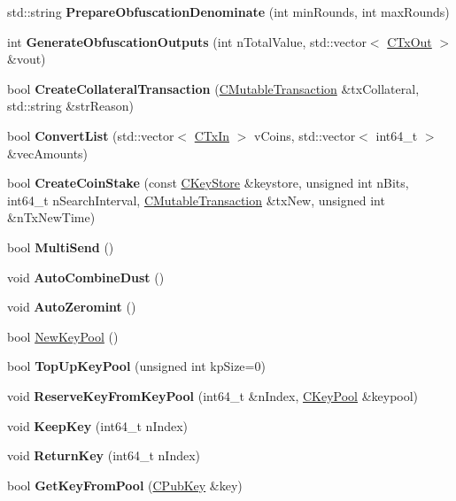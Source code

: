 \begin{DoxyCompactItemize}
\item 
std\+::string {\bfseries Prepare\+Obfuscation\+Denominate} (int min\+Rounds, int max\+Rounds)
\item 
\mbox{\label{class_c_wallet_a68e3d42562142942de698edd3f8d5ea0}} 
int {\bfseries Generate\+Obfuscation\+Outputs} (int n\+Total\+Value, std\+::vector$<$ \mbox{\hyperlink{class_c_tx_out}{C\+Tx\+Out}} $>$ \&vout)
\item 
bool {\bfseries Create\+Collateral\+Transaction} (\mbox{\hyperlink{struct_c_mutable_transaction}{C\+Mutable\+Transaction}} \&tx\+Collateral, std\+::string \&str\+Reason)
\item 
bool {\bfseries Convert\+List} (std\+::vector$<$ \mbox{\hyperlink{class_c_tx_in}{C\+Tx\+In}} $>$ v\+Coins, std\+::vector$<$ int64\+\_\+t $>$ \&vec\+Amounts)
\item 
bool {\bfseries Create\+Coin\+Stake} (const \mbox{\hyperlink{class_c_key_store}{C\+Key\+Store}} \&keystore, unsigned int n\+Bits, int64\+\_\+t n\+Search\+Interval, \mbox{\hyperlink{struct_c_mutable_transaction}{C\+Mutable\+Transaction}} \&tx\+New, unsigned int \&n\+Tx\+New\+Time)
\item 
\mbox{\label{class_c_wallet_ace77e9b4ffcfdbc61a327d02168620a2}} 
bool {\bfseries Multi\+Send} ()
\item 
\mbox{\label{class_c_wallet_a48b1e3fba569989535063b9b5308aa9e}} 
void {\bfseries Auto\+Combine\+Dust} ()
\item 
\mbox{\label{class_c_wallet_aef0cf2b12b958c75d72e694e4f4dad9f}} 
void {\bfseries Auto\+Zeromint} ()
\item 
bool \mbox{\hyperlink{group___actions_ga7353ba1e79fc4167fbfbe79b41698fa7}{New\+Key\+Pool}} ()
\item 
bool {\bfseries Top\+Up\+Key\+Pool} (unsigned int kp\+Size=0)
\item 
void {\bfseries Reserve\+Key\+From\+Key\+Pool} (int64\+\_\+t \&n\+Index, \mbox{\hyperlink{class_c_key_pool}{C\+Key\+Pool}} \&keypool)
\item 
void {\bfseries Keep\+Key} (int64\+\_\+t n\+Index)
\item 
void {\bfseries Return\+Key} (int64\+\_\+t n\+Index)
\item 
bool {\bfseries Get\+Key\+From\+Pool} (\mbox{\hyperlink{class_c_pub_key}{C\+Pub\+Key}} \&key)

\end{DoxyCompactItemize}
